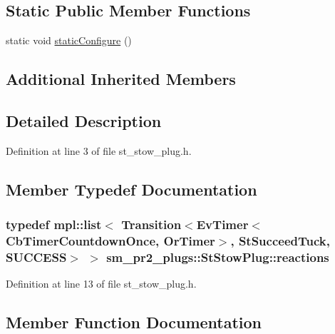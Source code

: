 \subsection*{Static Public Member Functions}
\begin{DoxyCompactItemize}
\item 
static void \hyperlink{structsm__pr2__plugs_1_1StStowPlug_a42733344b68d5558e349bf56db98efd6}{static\+Configure} ()
\end{DoxyCompactItemize}
\subsection*{Additional Inherited Members}


\subsection{Detailed Description}


Definition at line 3 of file st\+\_\+stow\+\_\+plug.\+h.



\subsection{Member Typedef Documentation}
\subsubsection[{\texorpdfstring{reactions}{reactions}}]{\setlength{\rightskip}{0pt plus 5cm}typedef mpl\+::list$<$ Transition$<$Ev\+Timer$<$Cb\+Timer\+Countdown\+Once, {\bf Or\+Timer}$>$, {\bf St\+Succeed\+Tuck}, {\bf S\+U\+C\+C\+E\+SS}$>$ $>$ {\bf sm\+\_\+pr2\+\_\+plugs\+::\+St\+Stow\+Plug\+::reactions}}\hypertarget{structsm__pr2__plugs_1_1StStowPlug_a30e66bd99b3feb400c8896aec05e5c4b}{}\label{structsm__pr2__plugs_1_1StStowPlug_a30e66bd99b3feb400c8896aec05e5c4b}


Definition at line 13 of file st\+\_\+stow\+\_\+plug.\+h.



\subsection{Member Function Documentation}
